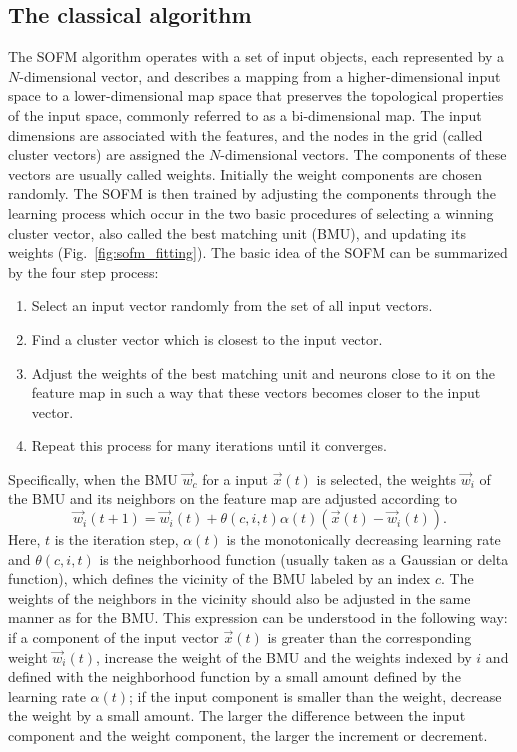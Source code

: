 \documentclass[%
  pra, aps, physrev,
  showkeys,
  twocolumn,
  showpacs,
  superscriptaddress,
  amsmath,amssymb,
  10pt
]{revtex4-2}
\begin{document}
\subsection{The classical algorithm}

The SOFM algorithm operates with a set of input objects, each represented by a $N$-dimensional vector,
and describes a mapping from a higher-dimensional input space to a lower-dimensional map space that preserves the topological properties of the input space, commonly referred to as a bi-dimensional map.  The input dimensions are associated with the features,
and the nodes in the grid (called cluster vectors) are assigned the $N$-dimensional vectors.
The components of these vectors are usually called weights.
Initially the weight components are chosen randomly.
The SOFM is then trained by adjusting the components through the learning process which occur in the two basic procedures of
selecting a winning cluster vector, also called the best matching unit (BMU), and updating its weights (Fig.~\ref{fig:sofm_fitting}).  The basic idea of the SOFM can be summarized by the four step process:
%
\begin{enumerate}
\item Select an input vector randomly from the set of all input vectors.
\item Find a cluster vector which is closest to the input vector.
\item Adjust the weights of the best matching unit and neurons close to it on the feature map in such a way   that these vectors  becomes closer to the input vector.
\item Repeat this process for many iterations until it converges.
\end{enumerate}

Specifically, when the BMU $\vec{w}_{c}$ for a input $\vec{x}(t)$ is selected,
the weights $\vec{w}_{i}$ of the BMU and its neighbors on the feature map are adjusted according to
%
\begin{equation}
    \label{eq:learning}
  \vec{w}_{i}(t + 1)
  = \vec{w}_{i}(t)
  + \theta(c, i, t) \alpha(t)
    \left(\vec{x}(t) - \vec{w}_{i}(t)\right) .
\end{equation}
%
Here, $ t $ is the iteration step,  $\alpha(t)$ is the monotonically decreasing learning rate and $\theta(c, i, t)$ is the neighborhood function (usually taken as a Gaussian or delta function), which defines the vicinity of the BMU labeled by an index $c$. The weights of the neighbors in the vicinity should also be adjusted in the same manner as for the BMU. This expression can be understood in the following way: if a component of the input vector $\vec{x}(t)$ is greater than the corresponding weight $ \vec{w}_{i}(t) $, increase the weight of the BMU and the weights indexed by $i$ and defined with the neighborhood function by a small amount defined by the learning rate $\alpha(t)$; if the input component is smaller than the weight, decrease the weight by a small amount. The larger the difference between the input component and the weight component, the larger the increment or decrement.
\end{document}
